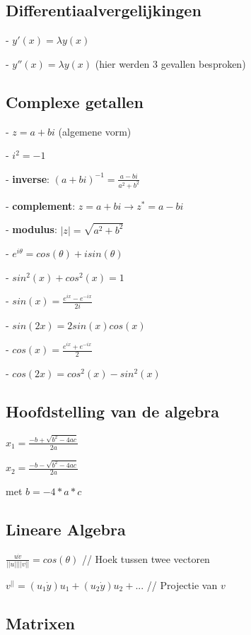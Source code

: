 \documentclass[a4paper]{article}
\begin{document}
\subsection*{Differentiaalvergelijkingen}

- $y'(x) = \lambda y(x)$

- $y''(x) = \lambda y(x)$ (hier werden 3 gevallen besproken)

\subsection*{Complexe getallen}

- $z = a + bi$ (algemene vorm)

- $i^2 = -1$

- \textbf{inverse}: $(a + bi)^{-1} = \frac{a - bi}{a^2 + b^2}$

- \textbf{complement}: $z = a + bi \rightarrow z^* = a - bi$

- \textbf{modulus}: $|z| = \sqrt{a^2 + b^2}$

- $e^{i\theta} = cos(\theta) + i sin(\theta)$

- $sin^2(x) + cos^2(x) = 1$

- $sin(x) = \frac{e^{ix} - e^{-ix}}{2i}$

- $sin(2x) = 2sin(x)cos(x)$

- $cos(x) = \frac{e^{ix} + e^{-ix}}{2}$

- $cos(2x) = cos^2(x) - sin^2(x)$

\subsection*{Hoofdstelling van de algebra}

$x_1 = \frac{-b + \sqrt{b^2 - 4ac}}{2a}$

$x_2 = \frac{-b - \sqrt{b^2 - 4ac}}{2a}$

met $b = -4*a*c$

\subsection*{Lineare Algebra}

$\frac{u\dot v}{||u|| ||v||} = cos(\theta)$ // Hoek tussen twee vectoren

$v^{||} = (u_1 \dot y) u_1 + (u_2 \dot y) u_2 + ...$ // Projectie van $v$

\subsection*{Matrixen}
\end{document}

